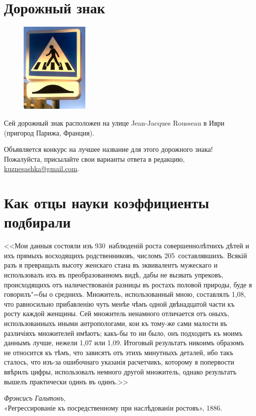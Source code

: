 \documentclass[11pt]{article}
\date{\vspace{-5ex}}
\begin{document}
	
	
	\AUTHOR{}{}
	\SHORTAUTHOR{}
	
\DoFirstPageTechnicalStuff

\section{Дорожный знак}

\begin{figure}\centering\vspace{-2ex}
	\includegraphics[width=3.3cm]{Normal-warning2.jpg}\vspace{-3ex}
\end{figure}
Сей дорожный знак расположен на улице Jean-Jacques Rousseau в Иври (пригород Парижа, Франция).

Объявляется конкурс на лучшее название для этого дорожного знака! Пожалуйста, присылайте свои варианты ответа в редакцию, \href{mailto:kuznesashka@gmail.com}{kuznesashka@gmail.com}. 

	\section{Как отцы науки коэффициенты подбирали}


<<Мои данныя состояли изъ 930~наблюденій роста совершеннолѣтнихъ дѣтей и ихъ прямыхъ восходящихъ родственниковъ, числомъ 205~составлявшихъ. Всякій разъ я превращалъ высоту женскаго стана въ эквивалентъ мужескаго и использовалъ ихъ въ преобразованномъ видѣ, дабы не вызвать упрековъ, происходящихъ отъ наличествованія разницы въ ростахъ половой природы, буде я говорилъ"=бы о среднихъ. Множитель, использованный мною, составлялъ 1,08, что равносильно прибавленію чуть менѣе чѣмъ одной двѣнадцатой части къ росту каждой женщины. Сей множитель ненамного отличается отъ оныхъ, использованныхъ иными антропологами, кои къ тому-же сами малости въ различіяхъ множителей имѣютъ; какъ-бы то ни было, онъ подходитъ къ моимъ даннымъ лучше, нежели 1,07 или 1,09. Итоговый результатъ никоимъ образомъ не относится къ тѣмъ, что зависятъ отъ этихъ минутныхъ деталей, ибо такъ сталось, что изъ-за ошибочнаго указанія расчетчикъ, которому я попервости ввѣрилъ цифры, использовалъ немного другой множитель, однако результатъ вышелъ практически одинъ въ одинъ.>>

\begin{flushright}
	\textit{Фрэнсисъ Гальтонъ}, \\
	«Регрессированіе къ посредственному при наслѣдованіи ростовъ», 1886.
\end{flushright}
	

	
\end{document}
